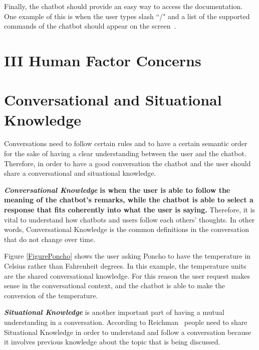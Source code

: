 \documentclass[a4paper,10pt]{article}
\begin{document}
Finally, the chatbot should provide an easy way to access the documentation. One example of this is when the user types slash ``/" and a list of the supported commands of the chatbot should appear on the screen~\cite{botfather}.  

\section*{III Human Factor Concerns}

\section{Conversational and Situational Knowledge}

Conversations need to follow certain rules and to have a certain semantic order for the sake of having a clear understanding between the user and the chatbot. Therefore, in order to have a good conversation the chatbot and the user should share a conversational and situational knowledge. 


\textbf{\textit{Conversational Knowledge}} \textbf{is when the user is able to follow the meaning of the chatbot's remarks, while the chatbot is able to select a response that fits coherently into what the user is saying.} Therefore, it is vital to understand how chatbots and users follow each others' thoughts. In other words, Conversational Knowledge is the common definitions in the conversation that do not change over time. 

Figure \ref{FigurePoncho} shows the user asking Poncho to have the temperature in Celsius rather than Fahrenheit degrees. In this example, the temperature units are the shared conversational knowledge. For this reason the user request makes sense in the conversational context, and the chatbot is able to make the conversion of the temperature.     


\textbf{\textit{Situational Knowledge}} is another important part of having a mutual understanding in a conversation. According to Reichman~\cite{reichman1985getting} people need to share Situational Knowledge in order to understand and follow a conversation because it involves previous knowledge about the topic that is being discussed.  
\end{document}
